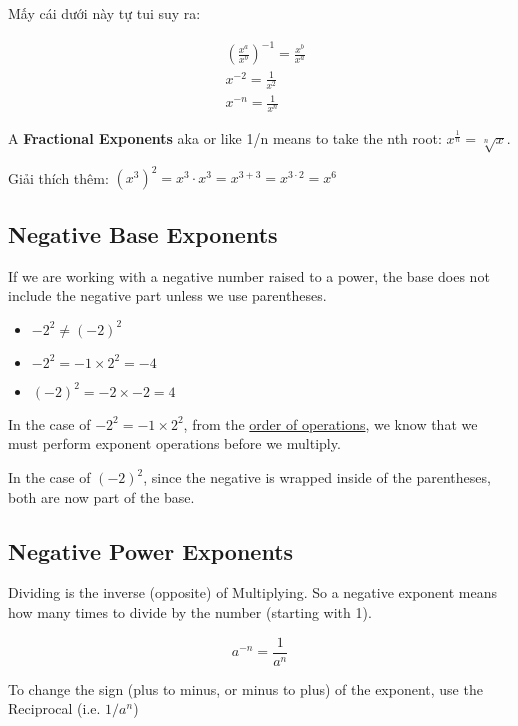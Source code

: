 Mấy cái dưới này tự tui suy ra:

\[
  \begin{aligned}
    &\left( \frac{x^{a}}{x^{b}} \right)^{-1} = \frac{x^{b}}{x^{a}}\\
    &x^{-2}=\frac{1}{x^{2}}\\
    &x^{-n}=\frac{1}{x^{n}}
  \end{aligned}
\]

A \textbf{Fractional Exponents} aka  or  like 1/n means to take the nth root: \(x^{\frac{1}{n}}=\sqrt[n]{x}\).

Giải thích thêm: $(x^{3})^{2}=x^{3}\cdot x^{3}=x^{3+3}=x^{3\cdot 2}=x^{6}$

\subsection{Negative Base Exponents}

If we are working with a negative number raised to a power, the base does not include the negative part unless we use parentheses.

\begin{itemize}
  \item \(-2^{2} \neq (-2)^{2}\)
  \item \(-2^{2}=-1 \times 2^{2}=-4\)
  \item \((-2)^{2} = -2 \times -2 = 4\)
\end{itemize}

In the case of \(-2^{2} = -1 \times 2^{2}\), from the \href{https://greenemath.com/Prealgebra/16/OrderofOperationsLesson.html}{order of operations}, we know that we must perform exponent operations before we multiply.

In the case of \((-2)^{2}\), since the negative is wrapped inside of the parentheses, both are now part of the base.

\subsection{Negative Power Exponents}

Dividing is the inverse (opposite) of Multiplying. So a negative exponent means how many times to divide by the number (starting with 1).

\[a^{-n} = \frac{1}{a^{n}}\]

To change the sign (plus to minus, or minus to plus) of the exponent, use the Reciprocal (i.e. \(1/a^{n}\))

